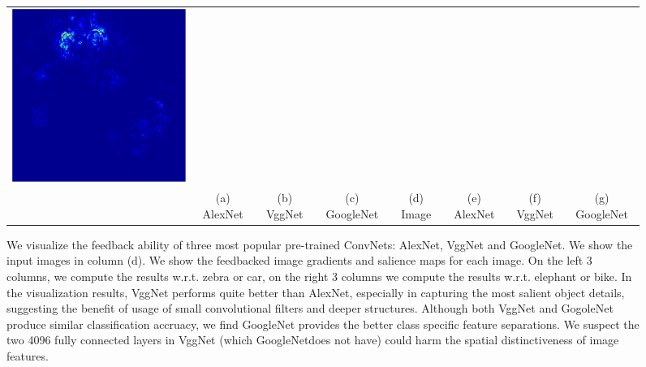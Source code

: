 \begin{figure}
\begin{center}
\begin{tabular}{cccccccc}
\includegraphics[width=0.13\linewidth]{figs/examples/googlenet/soft/bic-car2_sali_672} \\
&
{\small (a) AlexNet} &
{\small (b) VggNet} &
{\small (c) GoogleNet} &
{\small (d) Image} &
{\small (e) AlexNet} &
{\small (f) VggNet} &
{\small (g) GoogleNet}
\end{tabular}
\caption{We visualize the feedback ability of three most popular pre-trained ConvNets: AlexNet, VggNet and GoogleNet. We show the input images in column (d). We show the feedbacked image gradients and salience maps for each image. On the left 3 columns, we compute the results w.r.t. zebra or car, on the right 3 columns we compute the results w.r.t. elephant or bike. In the visualization results, VggNet performs quite better than AlexNet, especially in capturing the most salient object details, suggesting the benefit of usage of small convolutional filters and deeper structures. Although both VggNet and GogoleNet produce similar classification accruacy, we find GoogleNet provides the better class specific feature separations. We suspect the two 4096 fully connected layers in VggNet (which GoogleNetdoes not have) could harm the spatial distinctiveness of image features.}  
\label{fig:model_compare}
\end{center}
\end{figure}

